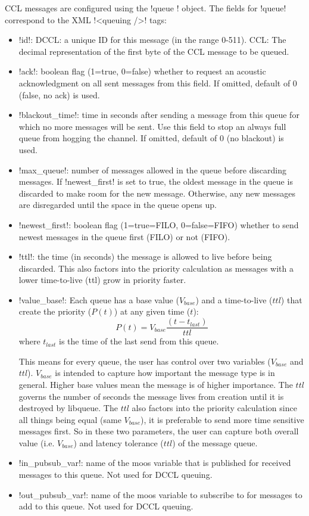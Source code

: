 CCL messages are configured using the !queue { }! object. The fields for !queue! correspond to the XML !<queuing />! tags:
\begin{itemize}
\item !id!: DCCL: a unique ID for this message (in the range 0-511). CCL: The decimal representation of the first byte of the CCL message to be queued. 
\item !ack!: boolean flag (1=true, 0=false) whether to request an
  acoustic acknowledgment on all sent messages from this field. If
  omitted, default of 0 (false, no ack) is used.
\item !blackout_time!: time in seconds after sending a message
  from this queue for which no more messages will be sent. Use this
  field to stop an always full queue from hogging the channel. If
  omitted, default of 0 (no blackout) is used.
\item !max_queue!: number of messages allowed in the queue before
  discarding messages. If !newest_first! is set to true, the
  oldest message in the queue is discarded to make room for the new
  message. Otherwise, any new messages are disregarded until the space
  in the queue opens up.
\item !newest_first!: boolean flag (1=true=FILO, 0=false=FIFO)
  whether to send newest messages in the queue first (FILO) or not
  (FIFO).
\item !ttl!: the time (in seconds) the message is allowed to live before being discarded. This also factors into the priority calculation as messages with a lower time-to-live (ttl) grow in priority faster. 
\item !value_base!: 
Each queue has a base value ($V_{base}$) and a time-to-live ($ttl$) that create the priority ($P(t)$) at any given time ($t$):
 \[
P(t) = V_{base} \frac{(t-t_{last})}{ttl}
 \]
 where $t_{last}$ is the time of the last send from this queue.

This means for every queue, the user has control over two variables ($V_{base}$ and $ttl$). $V_{base}$ is intended to capture how important the message type is in general. Higher base values mean the message is of higher importance. The $ttl$ governs the number of seconds the message lives from creation until it is destroyed by libqueue. The $ttl$ also factors into the priority calculation since all things being equal (same $V_{base}$), it is preferable to send more time sensitive messages first. So in these two parameters, the user can capture both overall value (i.e. $V_{base}$) and latency tolerance ($ttl$) of the message queue.

\item !in_pubsub_var!: name of the moos variable that is published for received messages to this queue. Not used for DCCL queuing.
\item !out_pubsub_var!: name of the moos variable to subscribe to for
  messages to add to this queue. Not used for DCCL queuing.
\end{itemize}

